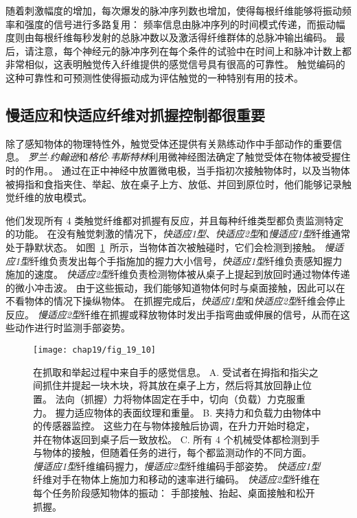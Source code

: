 随着刺激幅度的增加，每次爆发的脉冲序列数也增加，使得每根纤维能够将振动频率和强度的信号进行多路复用：
频率信息由脉冲序列的时间模式传递，而振动幅度则由每根纤维每秒发射的总脉冲数以及激活得纤维群体的总脉冲输出编码。
最后，请注意，每个神经元的脉冲序列在每个条件的试验中在时间上和脉冲计数上都非常相似，这表明触觉传入纤维提供的感觉信号具有很高的可靠性。 
触觉编码的这种可靠性和可预测性使得振动成为评估触觉的一种特别有用的技术。



\subsection{慢适应和快适应纤维对抓握控制都很重要}

除了感知物体的物理特性外，触觉受体还提供有关熟练动作中手部动作的重要信息。
\textit{罗兰$\cdot$约翰逊}和\textit{格伦$\cdot$韦斯特林}利用微神经图法确定了触觉受体在物体被受握住时的作用。。
通过在正中神经中放置微电极，当手指初次接触物体时，以及当物体被拇指和食指夹住、举起、放在桌子上方、放低、并回到原位时，他们能够记录触觉纤维的放电模式。


他们发现所有 4 类触觉纤维都对抓握有反应，并且每种纤维类型都负责监测特定的功能。
在没有触觉刺激的情况下，\textit{快适应1型}、\textit{快适应2型}和\textit{慢适应1型}纤维通常处于静默状态。
如图~\ref{fig:19_10}~所示，当物体首次被触碰时，它们会检测到接触。
\textit{慢适应1型}纤维负责发出每个手指施加的握力大小信号，\textit{快适应1型}纤维负责感知握力施加的速度。
\textit{快适应2型}纤维负责检测物体被从桌子上提起到放回时通过物体传递的微小冲击波。
由于这些振动，我们能够知道物体何时与桌面接触，因此可以在不看物体的情况下操纵物体。
在抓握完成后，\textit{快适应1型}和\textit{快适应2型}纤维会停止反应。
\textit{慢适应2型}纤维在抓握或释放物体时发出手指弯曲或伸展的信号，从而在这些动作进行时监测手部姿势。


\begin{figure}[htbp]
	\centering
	\texttt{[image: chap19/fig\_19\_10]}
	\caption{在抓取和举起过程中来自手的感觉信息\cite{johansson1996sensory}。
		A. 受试者在拇指和指尖之间抓住并提起一块木块，将其放在桌子上方，然后将其放回静止位置。
		法向（抓握）力将物体固定在手中，切向（负载）力克服重力。
		握力适应物体的表面纹理和重量。
		B. 夹持力和负载力由物体中的传感器监控。
		这些力在与物体接触后协调，在升力开始时稳定，并在物体返回到桌子后一致放松。
		C. 所有 4 个机械受体都检测到手与物体的接触，但随着任务的进行，每个都监测动作的不同方面。
		\textit{慢适应1型}纤维编码握力，\textit{慢适应2型}纤维编码手部姿势。
		\textit{快适应1型}纤维对手在物体上施加力和移动的速率进行编码。
		\textit{快适应2型}纤维在每个任务阶段感知物体的振动：
		手部接触、抬起、桌面接触和松开抓握。}
	\label{fig:19_10}
\end{figure}



